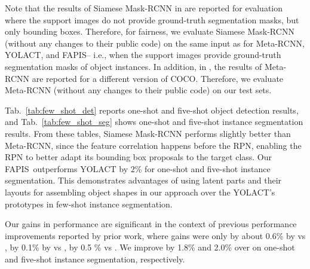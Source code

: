 \documentclass[final]{cvpr}
\def\Approach{FAPIS}
\begin{document}
Note that the results of Siamese Mask-RCNN  in \cite{michaelis2018one} are reported for evaluation where the support images do not provide ground-truth segmentation masks, but only bounding boxes. Therefore, for fairness, we evaluate Siamese Mask-RCNN (without any changes to their public code) on the same input as for Meta-RCNN, YOLACT, and \Approach -- i.e., when the support images provide ground-truth segmentation masks of object instances. In addition, in \cite{yanICCV19metarcnn}, the results of Meta-RCNN are reported for a different version of COCO. Therefore, we evaluate Meta-RCNN (without any changes to their public code) on our test sets.

Tab.~\ref{tab:few_shot_det} reports one-shot and five-shot object detection results, and Tab.~\ref{tab:few_shot_seg} shows one-shot and five-shot instance segmentation results. From these tables, Siamese Mask-RCNN performs slightly better than Meta-RCNN, since the feature correlation happens before the RPN, enabling the RPN to better adapt its bounding box proposals to the target class. %
Our \Approach~outperforms YOLACT by $2\%$ for one-shot and five-shot instance segmentation. This demonstrates  advantages of using latent parts and their layouts for assembling object shapes in our approach over the YOLACT's prototypes in few-shot instance segmentation. 

Our gains in performance are significant in the context of previous performance improvements reported by prior work, where gains were only by about 0.6\% by \cite{michaelis2018one} vs \cite{yanICCV19metarcnn}, by 0.1\% by \cite{michaelis2018one} vs \cite{bolya2019yolact}, by 0.5 \% \cite{bolya2019yolact} vs \cite{yanICCV19metarcnn}. We improve by 1.8\% and 2.0\% over \cite{michaelis2018one} on one-shot and five-shot instance segmentation, respectively.


\end{document}
